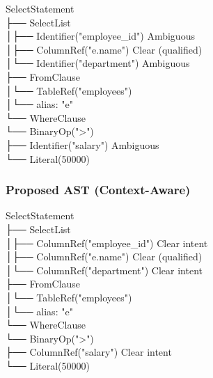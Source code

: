 \documentclass[11pt,a4paper]{article}
\newcommand{\checkmarksymbol}{{\color{successgreen}\ding{51}}}  %
\newcommand{\crosssymbol}{{\color{dangerred}\ding{55}}}  %
\begin{document}
\begin{tcolorbox}[
    colback=dangerred!5!white,
    colframe=dangerred!75!black,
    title={\faExclamationTriangle\space Ambiguous Node Types},
    fonttitle=\bfseries
]
{\ttfamily\small
SelectStatement\\
├── SelectList\\
│\phantom{xx}├── Identifier("employee\_id")\hfill\crosssymbol{} Ambiguous\\
│\phantom{xx}├── ColumnRef("e.name")\hfill\checkmarksymbol{} Clear (qualified)\\
│\phantom{xx}└── Identifier("department")\hfill\crosssymbol{} Ambiguous\\
├── FromClause\\
│\phantom{xx}└── TableRef("employees")\\
│\phantom{xxxxxx}└── alias: "e"\\
└── WhereClause\\
\phantom{xxxx}└── BinaryOp(">")\\
\phantom{xxxxxxxx}├── Identifier("salary")\hfill\crosssymbol{} Ambiguous\\
\phantom{xxxxxxxx}└── Literal(50000)
}
\end{tcolorbox}

\subsubsection{Proposed AST (Context-Aware)}

\begin{tcolorbox}[
    colback=successgreen!5!white,
    colframe=successgreen!75!black,
    title={\faCheckCircle\space Clear Intent Nodes},
    fonttitle=\bfseries
]
{\ttfamily\small
SelectStatement\\
├── SelectList\\
│\phantom{xx}├── ColumnRef("employee\_id")\hfill\checkmarksymbol{} Clear intent\\
│\phantom{xx}├── ColumnRef("e.name")\hfill\checkmarksymbol{} Clear (qualified)\\
│\phantom{xx}└── ColumnRef("department")\hfill\checkmarksymbol{} Clear intent\\
├── FromClause\\
│\phantom{xx}└── TableRef("employees")\\
│\phantom{xxxxxx}└── alias: "e"\\
└── WhereClause\\
\phantom{xxxx}└── BinaryOp(">")\\
\phantom{xxxxxxxx}├── ColumnRef("salary")\hfill\checkmarksymbol{} Clear intent\\
\phantom{xxxxxxxx}└── Literal(50000)
}
\end{tcolorbox}
\end{document}
